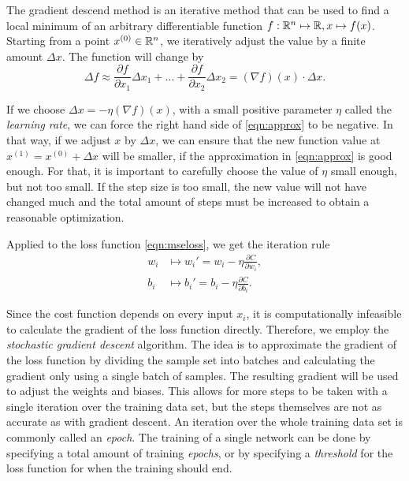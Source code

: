 The gradient descend method is an iterative method that can be used to find a local minimum of an arbitrary differentiable function $f: \mathbb{R}^n \mapsto \mathbb{R}, x \mapsto f(x)$. Starting from a point $x^{(0)} \in \mathbb{R}^n$, we iteratively adjust the value by a finite amount $\Delta x$. The function will change by
\begin{equation}
  \label{eqn:approx}
  \Delta f \approx \frac{\partial f}{\partial x_1} \Delta x_1 + \dots + \frac{\partial f}{\partial x_2} \Delta x_2 = (\nabla f)(x) \cdot \Delta x.
\end{equation}

If we choose $\Delta x = -\eta (\nabla f)(x)$, with a small positive parameter $\eta$ called the \textit{learning rate}, we can force the right hand side of \eqref{eqn:approx} to be negative. In that way, if we adjust $x$ by $\Delta x$, we can ensure that the new function value at $x^{(1)} = x^{(0)}+ \Delta x$ will be smaller, if the approximation in \eqref{eqn:approx} is good enough. For that, it is important to carefully choose the value of $\eta$ small enough, but not too small. If the step size is too small, the new value will not have changed much and the total amount of steps must be increased to obtain a reasonable optimization.

Applied to the loss function \eqref{eqn:mseloss}, we get the iteration rule
\begin{align}
  w_i & \mapsto w_i' = w_i - \eta \frac{\partial C}{\partial w_i}, \\
  b_i & \mapsto b_i' = b_i - \eta \frac{\partial C}{\partial b_i}.
\end{align}

Since the cost function depends on every input $x_i$, it is computationally infeasible to calculate the gradient of the loss function directly. Therefore, we employ the \textit{stochastic gradient descent} algorithm. The idea is to approximate the gradient of the loss function by dividing the sample set into batches and calculating the gradient only using a single batch of samples. The resulting gradient will be used to adjust the weights and biases. This allows for more steps to be taken with a single iteration over the training data set, but the steps themselves are not as accurate as with gradient descent. An iteration over the whole training data set is commonly called an \textit{epoch}. The training of a single network can be done by specifying a total amount of training \textit{epochs}, or by specifying a \textit{threshold} for the loss function for when the training should end.

